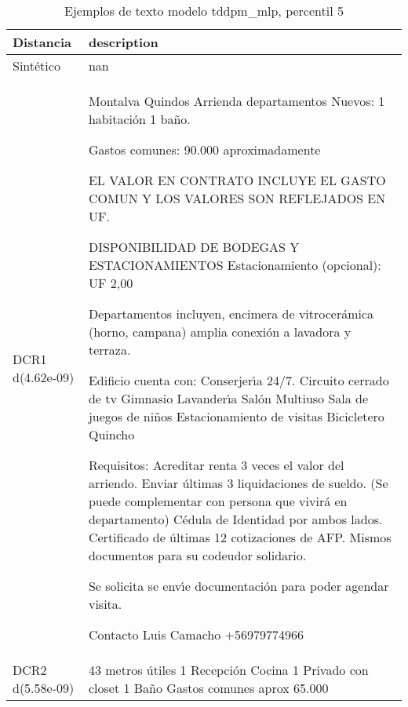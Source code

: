 \begin{table}[H]
\centering
\fontsize{10}{14}\selectfont
\caption{Ejemplos de texto modelo tddpm\_mlp, percentil 5}
\label{table-example-economicos-a-2-tddpm_mlp-5p-text}
\begin{tabular}{|l|m{35em}|}
\hline
\rowcolor[gray]{0.8}
Distancia & description \\
\hline Sintético & nan \\
\hline DCR1 d(4.62e-09) & Montalva Quindos Arrienda departamentos Nuevos: 1 habitaci\'on 1 ba\~no.

Gastos comunes: 90.000 aproximadamente

EL VALOR EN CONTRATO INCLUYE EL GASTO COMUN Y LOS VALORES SON REFLEJADOS EN UF. 

DISPONIBILIDAD DE BODEGAS Y ESTACIONAMIENTOS
Estacionamiento (opcional): UF 2,00

Departamentos incluyen, encimera de vitrocer\'amica (horno, campana) amplia conexi\'on a lavadora y terraza.

Edificio cuenta con:
Conserjer{\'\i}a 24/7.
Circuito cerrado de tv
Gimnasio
Lavander{\'\i}a
Sal\'on Multiuso
Sala de juegos de ni\~nos
Estacionamiento de visitas
Bicicletero
Quincho

Requisitos:
Acreditar renta 3 veces el valor del arriendo. Enviar \'ultimas 3 liquidaciones de sueldo. (Se puede complementar con persona que vivir\'a en departamento)
C\'edula de Identidad por ambos lados.
Certificado de \'ultimas 12 cotizaciones de AFP.
Mismos documentos para su codeudor solidario.

Se solicita se env{\'\i}e documentaci\'on para poder agendar visita.

Contacto
Luis Camacho
+56979774966 \\
\hline DCR2 d(5.58e-09) & 43 metros \'utiles 1 Recepci\'on Cocina 1 Privado con closet 1 Ba\~no Gastos comunes aprox 65.000 \\
\hline
\end{tabular}
\end{table}
